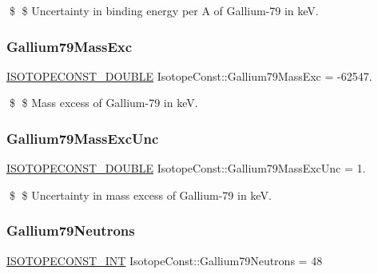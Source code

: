 \$ \$ Uncertainty in binding energy per A of Gallium-\/79 in keV. \mbox{\label{group___isotope_const-_gallium-_ga79_gad5855bd2180982f057cd7a3debd1edff}} 
\subsubsection{\texorpdfstring{Gallium79\+Mass\+Exc}{Gallium79MassExc}}
{\footnotesize\ttfamily \mbox{\hyperlink{group___isotope_const-_macros_ga8f45a7272ce02c0b4c65c44636ed719a}{I\+S\+O\+T\+O\+P\+E\+C\+O\+N\+S\+T\+\_\+\+D\+O\+U\+B\+LE}} Isotope\+Const\+::\+Gallium79\+Mass\+Exc = -\/62547.}

\$ \$ Mass excess of Gallium-\/79 in keV. \mbox{\label{group___isotope_const-_gallium-_ga79_gac39d5c724eaa549f3a262f0dff4aa819}} 
\subsubsection{\texorpdfstring{Gallium79\+Mass\+Exc\+Unc}{Gallium79MassExcUnc}}
{\footnotesize\ttfamily \mbox{\hyperlink{group___isotope_const-_macros_ga8f45a7272ce02c0b4c65c44636ed719a}{I\+S\+O\+T\+O\+P\+E\+C\+O\+N\+S\+T\+\_\+\+D\+O\+U\+B\+LE}} Isotope\+Const\+::\+Gallium79\+Mass\+Exc\+Unc = 1.}

\$ \$ Uncertainty in mass excess of Gallium-\/79 in keV. \mbox{\label{group___isotope_const-_gallium-_ga79_gade06789d018688fc6e7fba485a115c13}} 
\subsubsection{\texorpdfstring{Gallium79\+Neutrons}{Gallium79Neutrons}}
{\footnotesize\ttfamily \mbox{\hyperlink{group___isotope_const-_macros_ga5f18360b3e99483a35c32d789e62621c}{I\+S\+O\+T\+O\+P\+E\+C\+O\+N\+S\+T\+\_\+\+I\+NT}} Isotope\+Const\+::\+Gallium79\+Neutrons = 48}

